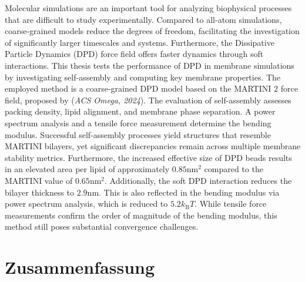 \documentclass[
    11pt,
    a4paper,
    oneside,        %
    BCOR=10mm,      %
    parskip=half,   %
    listof=nototoc,   %
    bibliography=totoc %
]{scrreprt}
\begin{document}
Molecular simulations are an important tool for analyzing biophysical processes that are difficult to study experimentally. Compared to all-atom simulations, coarse-grained models reduce the degrees of freedom, facilitating the investigation of significantly larger timescales and systems. Furthermore, the Dissipative Particle Dynamics (DPD) force field offers faster dynamics through soft interactions. This thesis tests the performance of DPD in membrane simulations by investigating self-assembly and computing key membrane properties. The employed method is a coarse-grained DPD model based on the MARTINI 2 force field, proposed by \citeauthor{Wang2024} (\textit{ACS Omega, 2024}). The evaluation of self-assembly assesses packing density, lipid alignment, and membrane phase separation. A power spectrum analysis and a tensile force measurement determine the bending modulus. Successful self-assembly processes yield structures that resemble MARTINI bilayers, yet significant discrepancies remain across multiple membrane stability metrics. Furthermore, the increased effective size of DPD beads results in an elevated area per lipid of approximately $0.85\si{\nano\m\squared}$ compared to the MARTINI value of $0.65\si{\nano\m\squared}$. Additionally, the soft DPD interaction reduces the bilayer thickness to $2.9\si{\nano\m}$. This is also reflected in the bending modulus via power spectrum analysis, which is reduced to $5.2k_\text{B}T$. While tensile force measurements confirm the order of magnitude of the bending modulus, this method still poses substantial convergence challenges.

\chapter*{Zusammenfassung}
\end{document}
